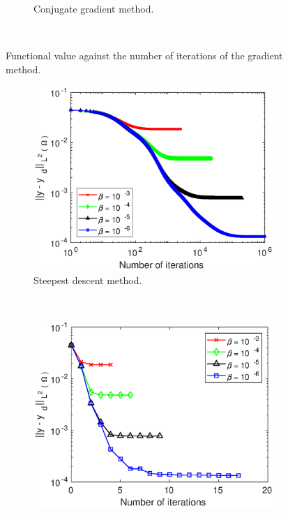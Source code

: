 \documentclass[10pt,a4paper]{article}
\begin{document}
\begin{figure}[h]
\begin{subfigure}[b]{0.4\textwidth}
        \caption{Conjugate gradient method.}
        \label{fig:CGcostviterations}
    \end{subfigure}
    ~ %
    \caption{Functional value against the number of iterations of the gradient method.}\label{fig:Results1}
\end{figure}

\begin{figure}[h]
    \centering
    \begin{subfigure}[b]{0.4\textwidth}
        \includegraphics[width=\textwidth]{sd_Jy.eps}
        \caption{Steepest descent method.}
        \label{fig:SDcostviterations}
    \end{subfigure}
    ~ %
    \begin{subfigure}[b]{0.4\textwidth}
        \includegraphics[width=\textwidth]{cg_Jy.eps}

\end{subfigure}
\end{figure}
\end{document}
